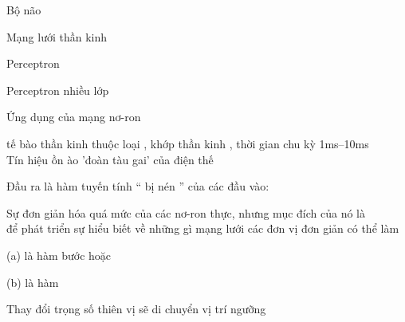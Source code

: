 \documentclass{article}
\begin{document}
\begin{huge}

\sf


\blob Bộ não

\blob Mạng lưới thần kinh

\blob Perceptron

\blob Perceptron nhiều lớp

\blob Ứng dụng của mạng nơ-ron




 tế bào thần kinh thuộc loại , khớp thần kinh , thời gian chu kỳ 1ms--10ms\\
Tín hiệu ồn ào 'đoàn tàu gai' của điện thế

\vspace*{0.2in}

\textwidth
{}



Đầu ra là hàm tuyến tính `` bị nén '' của các đầu vào:
\mat{\[
a_i \leftarrow g(in_i) = g\left(\mysum_j \w{j}{i} a_j\right)
\]}


\vspace*{0.2in}

\textwidth
{}

Sự đơn giản hóa quá mức của các nơ-ron thực, nhưng mục đích của nó là\\
để phát triển sự hiểu biết về những gì mạng lưới các đơn vị đơn giản có thể làm



\vspace*{0.2in}

\textwidth
{}

(a) là hàm bước  hoặc 

(b) là hàm  

Thay đổi trọng số thiên vị  sẽ di chuyển vị trí ngưỡng






\end{huge}
\end{document}
